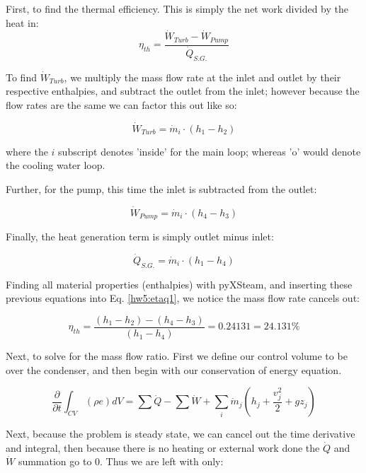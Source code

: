 \documentclass{article}
\begin{document}
First, to find the thermal efficiency. This is simply the net work divided by the heat in:
\begin{equation}
    \eta_{th} = \frac{\Dot{W}_{Turb} - \Dot{W}_{Pump}}{\Dot{Q}_{S.G.}}
    \label{hw5:etaq1}
\end{equation}

To find $\Dot{W}_{Turb}$, we multiply the mass flow rate at the inlet and outlet by their respective enthalpies, and subtract the outlet from the inlet; however because the flow rates are the same we can factor this out like so:

\begin{equation}
    \Dot{W}_{Turb} = \Dot{m}_i \cdot \left( h_1 - h_2\right)
\end{equation}

where the $i$ subscript denotes 'inside' for the main loop; whereas 'o' would denote the cooling water loop.

Further, for the pump, this time the inlet is subtracted from the outlet:

\begin{equation}
    \Dot{W}_{Pump} = \Dot{m}_i \cdot \left( h_4 - h_3\right)
\end{equation}

Finally, the heat generation term is simply outlet minus inlet:

\begin{equation}
    \Dot{Q}_{S.G.} = \Dot{m}_i \cdot \left( h_1 - h_4\right)
\end{equation}

Finding all material properties (enthalpies) with pyXSteam, and inserting these previous equations into Eq. \ref{hw5:etaq1}, we notice the mass flow rate cancels out:

\[
    \boxed{\eta_{th} = \frac{(h_1 - h_2) - (h_4 - h_3)}{(h_1 - h_4)} = 0.24131 = 24.131\%}
\]

Next, to solve for the mass flow ratio. First we define our control volume to be over the condenser, and then begin with our conservation of energy equation.

\begin{equation}
    \label{hw5:cons_ener}
    \frac{\partial}{\partial t} \int_{CV} (\rho e) dV = \sum \Dot{Q} - \sum \Dot{W} + \sum_{i} \Dot{m}_j \left( h_j + \frac{v_j^2}{2} + gz_j \right)
\end{equation}

Next, because the problem is steady state, we can cancel out the time derivative and integral, then because there is no heating or external work done the $\Dot{Q}$ and $\Dot{W}$ summation go to 0. Thus we are left with only:
\end{document}
